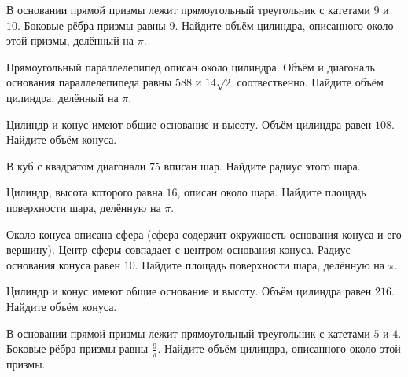 \documentclass[4apaper]{article}
\begin{document}
\begin{taskBN}{74}
В основании прямой призмы лежит прямоугольный треугольник с катетами $9$ и $10$. Боковые рёбра призмы равны $9$. Найдите объём цилиндра, описанного около этой призмы, делённый на $\pi$.
\end{taskBN}

\begin{taskBN}{75}
Прямоугольный параллелепипед описан около цилиндра. Объём и диагональ основания параллелепипеда равны $588$ и $14\sqrt{2}$ соотвественно. Найдите объём цилиндра, делённый на $\pi$.
\end{taskBN}

\begin{taskBN}{76}
Цилиндр и конус имеют общие основание и высоту. Объём цилиндра равен $108$. Найдите объём конуса.
\end{taskBN}

\begin{taskBN}{77}
В куб с квадратом диагонали $75$ вписан шар. Найдите радиус этого шара.
\end{taskBN}

\begin{taskBN}{78}
 Цилиндр, высота которого равна $16$, описан около шара. Найдите площадь поверхности шара, делённую на $\pi$.
\end{taskBN}

\begin{taskBN}{79}
Около конуса описана сфера (сфера содержит окружность основания конуса и его вершину). Центр сферы совпадает с центром основания конуса. Радиус основания конуса равен $10$. Найдите площадь поверхности шара, делённую на $\pi$.
\end{taskBN}

\begin{taskBN}{80}
Цилиндр и конус имеют общие основание и высоту. Объём цилиндра равен $216$. Найдите объём конуса.
\end{taskBN}

\begin{taskBN}{81}
В основании прямой призмы лежит прямоугольный треугольник с катетами $5$ и $4$. Боковые рёбра призмы равны $\frac{9}{\pi}$. Найдите объём цилиндра, описанного около этой призмы.
\end{taskBN}
\end{document}
